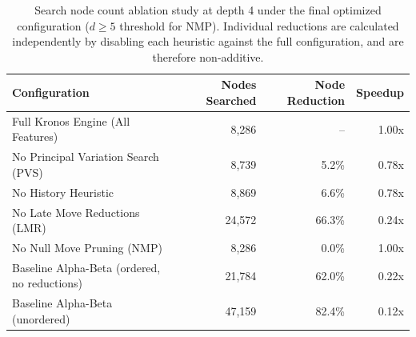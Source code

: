 \begin{table}[htbp]
\centering
\caption[Search Node Ablation Study at Depth 4]{Search node count ablation study at depth 4 under the final optimized configuration ($d \ge 5$ threshold for NMP). Individual reductions are calculated independently by disabling each heuristic against the full configuration, and are therefore non-additive.}
\label{tab:node_counts}
\begin{tabularx}{\textwidth}{Xrrr}
\toprule
\textbf{Configuration} & \textbf{Nodes Searched} & \textbf{Node Reduction} & \textbf{Speedup} \\
\midrule
Full Kronos Engine (All Features) & 8,286  & --     & 1.00x \\
No Principal Variation Search (PVS) & 8,739  & 5.2\%  & 0.78x \\
No History Heuristic              & 8,869  & 6.6\%  & 0.78x \\
No Late Move Reductions (LMR)     & 24,572 & 66.3\% & 0.24x \\
No Null Move Pruning (NMP)        & 8,286  & 0.0\%  & 1.00x \\
Baseline Alpha-Beta (ordered, no reductions) & 21,784 & 62.0\% & 0.22x \\
Baseline Alpha-Beta (unordered) & 47,159 & 82.4\% & 0.12x \\
\bottomrule
\end{tabularx}
\end{table}


